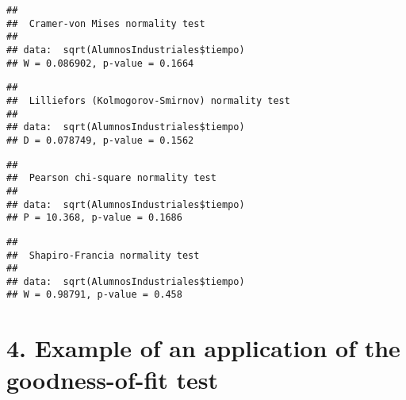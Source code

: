 \documentclass[
]{article}
\newenvironment{Shaded}{\begin{snugshade}}{\end{snugshade}}
\newcommand{\AttributeTok}[1]{\textcolor[rgb]{0.13,0.29,0.53}{#1}}
\newcommand{\DecValTok}[1]{\textcolor[rgb]{0.00,0.00,0.81}{#1}}
\newcommand{\FunctionTok}[1]{\textcolor[rgb]{0.13,0.29,0.53}{\textbf{#1}}}
\newcommand{\NormalTok}[1]{#1}
\newcommand{\SpecialCharTok}[1]{\textcolor[rgb]{0.81,0.36,0.00}{\textbf{#1}}}
\begin{document}
\begin{verbatim}
## 
##  Cramer-von Mises normality test
## 
## data:  sqrt(AlumnosIndustriales$tiempo)
## W = 0.086902, p-value = 0.1664
\end{verbatim}

\begin{Shaded}
\end{Shaded}

\begin{verbatim}
## 
##  Lilliefors (Kolmogorov-Smirnov) normality test
## 
## data:  sqrt(AlumnosIndustriales$tiempo)
## D = 0.078749, p-value = 0.1562
\end{verbatim}

\begin{Shaded}
\end{Shaded}

\begin{verbatim}
## 
##  Pearson chi-square normality test
## 
## data:  sqrt(AlumnosIndustriales$tiempo)
## P = 10.368, p-value = 0.1686
\end{verbatim}

\begin{Shaded}
\end{Shaded}

\begin{verbatim}
## 
##  Shapiro-Francia normality test
## 
## data:  sqrt(AlumnosIndustriales$tiempo)
## W = 0.98791, p-value = 0.458
\end{verbatim}

\hypertarget{example-of-an-application-of-the-goodness-of-fit-test}{%
\section{4. Example of an application of the goodness-of-fit
test}\label{example-of-an-application-of-the-goodness-of-fit-test}}
\end{document}
